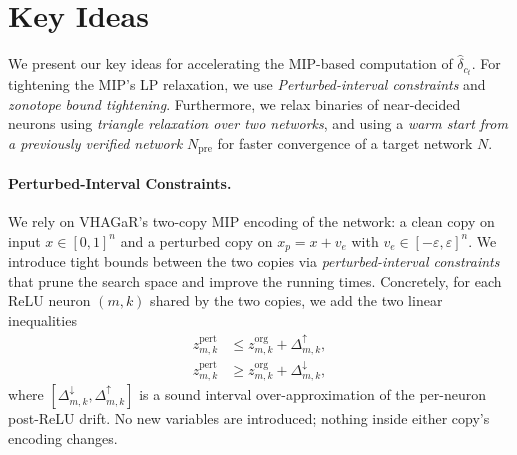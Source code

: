 \documentclass[11pt]{article}
\newcommand{\ep}{\varepsilon}
\begin{document}
\section{Key Ideas}
\label{sec:key_ideas}

We present our key ideas for accelerating the MIP-based computation of $\hat{\delta}_{c_t}$.
For tightening the MIP's LP relaxation, we use \emph{Perturbed-interval constraints} and 
\emph{zonotope bound tightening}. Furthermore, we relax binaries of near-decided neurons 
using \emph{triangle relaxation over two networks}, 
and using a \emph{warm start from a previously verified network $N_\text{pre}$} 
for faster convergence of a target network $N$.

\paragraph{Perturbed-Interval Constraints.}
\label{sec:tech:pi}

We rely on VHAGaR's two-copy MIP encoding of the network: a clean copy on input $x \in [0,1]^n$ and a perturbed copy on $x_p = x + v_e$ with $v_e \in [-\ep,\ep]^n$. We introduce tight bounds between the two copies via \emph{perturbed-interval constraints} that prune the search space and improve the running times. Concretely, for each ReLU neuron $(m,k)$ shared by the two copies, we add the two linear inequalities
\begin{align}
  z^{\mathrm{pert}}_{m,k} &\le z^{\mathrm{org}}_{m,k} + \Delta^{\uparrow}_{m,k}, \label{eq:pi_upper}\\
  z^{\mathrm{pert}}_{m,k} &\ge z^{\mathrm{org}}_{m,k} + \Delta^{\downarrow}_{m,k}, \label{eq:pi_lower}
\end{align}
where $[\Delta^\downarrow_{m,k}, \Delta^\uparrow_{m,k}]$ is a sound interval over-approximation of the per-neuron post-ReLU drift. No new variables are introduced; nothing inside either copy's encoding changes.
\end{document}
